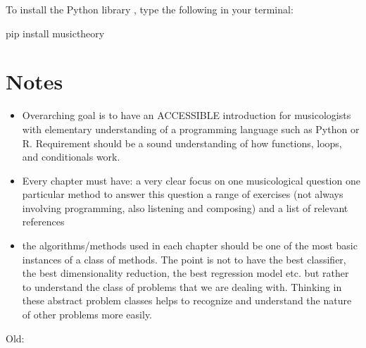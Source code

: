 \documentclass[letterpaper,10pt,english]{sphinxmanual}
\begin{document}
To install the Python library , type the following in your terminal:

\begin{sphinxVerbatim}[commandchars=\\\{\}]
pip install musictheory
\end{sphinxVerbatim}


\section{Notes}
\label{\detokenize{1_intro:notes}}\begin{itemize}
\item {} 
Overarching goal is to have an ACCESSIBLE introduction for musicologists with elementary understanding of a programming language such as Python or R. Requirement should be a sound understanding of how functions, loops, and conditionals work.

\item {} 
Every chapter must have:
\textendash{} a very clear focus on one musicological question
\textendash{} one particular method to answer this question
\textendash{} a range of exercises (not always involving programming, also listening and composing)
\textendash{} and a list of relevant references

\item {} 
the algorithms/methods used in each chapter should be one of the most basic instances of a class of methods. The point is not to have the best classifier, the best dimensionality reduction, the best regression model etc. but rather to understand the class of problems that we are dealing with. Thinking in these abstract problem classes helps to recognize and understand the nature of other problems more easily.

\end{itemize}

Old:
\end{document}
